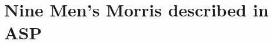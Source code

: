 \documentclass[12pt,twoside]{report}
\begin{document}

\appendix


\chapter{Nine Men's Morris described in ASP}

\end{document}
